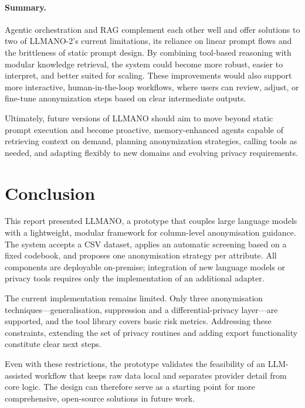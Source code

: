 \documentclass{article}
\begin{document}
\paragraph{Summary.}
Agentic orchestration and RAG complement each other well and offer solutions to two of LLMANO-2’s current limitations, its reliance on linear prompt flows and the brittleness of static prompt design. By combining tool-based reasoning with modular knowledge retrieval, the system could become more robust, easier to interpret, and better suited for scaling. These improvements would also support more interactive, human-in-the-loop workflows, where users can review, adjust, or fine-tune anonymization steps based on clear intermediate outputs.

Ultimately, future versions of LLMANO should aim to move beyond static prompt execution and become proactive, memory-enhanced agents capable of retrieving context on demand, planning anonymization strategies, calling tools as needed, and adapting flexibly to new domains and evolving privacy requirements.


\section{Conclusion}
\label{sec:conclusion}

This report presented LLMANO, a prototype that couples large language models with a lightweight, modular framework for column-level anonymisation guidance.  The system accepts a CSV dataset, applies an automatic screening based on a fixed codebook, and proposes one anonymisation strategy per attribute.  All components are deployable on-premise; integration of new language models or privacy tools requires only the implementation of an additional adapter.

The current implementation remains limited.  Only three anonymisation techniques—generalisation, suppression and a differential-privacy layer—are supported, and the tool library covers basic risk metrics. Addressing these constraints, extending the set of privacy routines and adding export functionality constitute clear next steps.

Even with these restrictions, the prototype validates the feasibility of an LLM-assisted workflow that keeps raw data local and separates provider detail from core logic.  The design can therefore serve as a starting point for more comprehensive, open-source solutions in future work.
\end{document}
